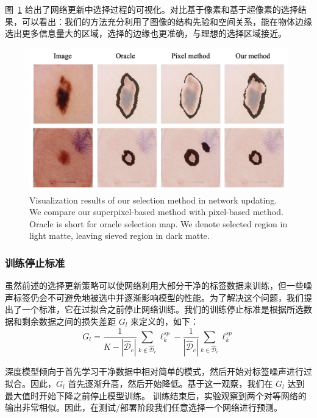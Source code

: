 图~\ref{fig:vis_select} 给出了网络更新中选择过程的可视化。对比基于像素和基于超像素的选择结果，可以看出：我们的方法充分利用了图像的结构先验和空间关系，能在物体边缘选出更多信息量大的区域，选择的边缘也更准确，与理想的选择区域接近。

    \begin{figure}[tbp]
        \centering 
        \includegraphics[width=1.0\textwidth]{img/c4/f42m.png}
        {Visualization results of our selection method in network updating. We compare our superpixel-based method with pixel-based method. Oracle is short for oracle selection map. We denote selected region in light matte, leaving sieved region in dark matte. }
        \label{fig:vis_select}
    \end{figure}

\subsubsection{训练停止标准}
虽然前述的选择更新策略可以使网络利用大部分干净的标签数据来训练，但一些噪声标签仍会不可避免地被选中并逐渐影响模型的性能。为了解决这个问题，我们提出了一个标准，它在过拟合之前停止网络训练。我们的训练停止标准是根据所选数据和剩余数据之间的损失差距 $G_l$ 来定义的，如下：
\begin{equation}\label{loss_gap}
	G_{l} =    \frac{1}{K-|\mathcal{\hat{D}}_c|}\sum_{k \notin \mathcal{\hat{D}}_c}\ell_k^{sp} - \frac{1}{|\mathcal{\hat{D}}_c|}\sum_{k \in \mathcal{\hat{D}}_c}\ell_k^{sp} 
\end{equation}

深度模型倾向于首先学习干净数据中相对简单的模式，然后开始对标签噪声进行过拟合\citep{arpit2017closer}。因此，$G_{l}$ 首先逐渐升高，然后开始降低。基于这一观察，我们在 $G_{l}$ 达到最大值时开始下降之前停止模型训练。
训练结束后，实验观察到两个对等网络的输出非常相似。因此，在测试/部署阶段我们任意选择一个网络进行预测。

